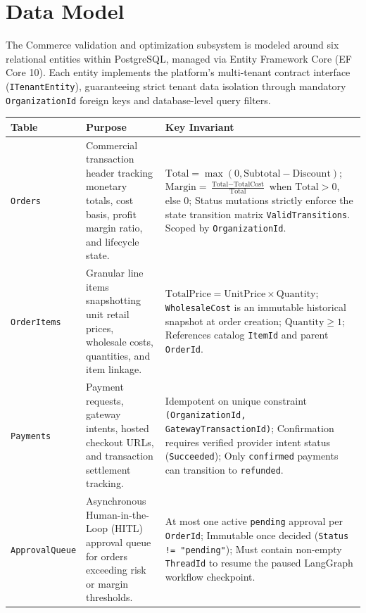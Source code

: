 \section{Data Model}
\label{sec:c-data}

The Commerce validation and optimization subsystem is modeled around six relational entities within PostgreSQL, managed via Entity Framework Core (EF Core 10). Each entity implements the platform's multi-tenant contract interface (\texttt{ITenantEntity}), guaranteeing strict tenant data isolation through mandatory \texttt{OrganizationId} foreign keys and database-level query filters.

\begin{table}[h!]
\centering
\small
\begin{tabularx}{\textwidth}{l p{5cm} X}
\toprule
\textbf{Table} & \textbf{Purpose} & \textbf{Key Invariant} \\
\midrule
\texttt{Orders} & Commercial transaction header tracking monetary totals, cost basis, profit margin ratio, and lifecycle state. & $\text{Total} = \max(0, \text{Subtotal} - \text{Discount})$; $\text{Margin} = \frac{\text{Total} - \text{TotalCost}}{\text{Total}}$ when $\text{Total} > 0$, else $0$; Status mutations strictly enforce the state transition matrix \texttt{ValidTransitions}. Scoped by \texttt{OrganizationId}. \\
\addlinespace
\texttt{OrderItems} & Granular line items snapshotting unit retail prices, wholesale costs, quantities, and item linkage. & $\text{TotalPrice} = \text{UnitPrice} \times \text{Quantity}$; \texttt{WholesaleCost} is an immutable historical snapshot at order creation; $\text{Quantity} \ge 1$; References catalog \texttt{ItemId} and parent \texttt{OrderId}. \\
\addlinespace
\texttt{Payments} & Payment requests, gateway intents, hosted checkout URLs, and transaction settlement tracking. & Idempotent on unique constraint \texttt{(OrganizationId, GatewayTransactionId)}; Confirmation requires verified provider intent status (\texttt{Succeeded}); Only \texttt{confirmed} payments can transition to \texttt{refunded}. \\
\addlinespace
\texttt{ApprovalQueue} & Asynchronous Human-in-the-Loop (HITL) approval queue for orders exceeding risk or margin thresholds. & At most one active \texttt{pending} approval per \texttt{OrderId}; Immutable once decided (\texttt{Status != "pending"}); Must contain non-empty \texttt{ThreadId} to resume the paused LangGraph workflow checkpoint. \\

\end{tabularx}
\end{table}
